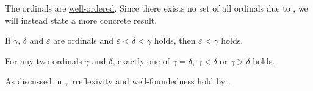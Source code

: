 \begin{proposition}\label{thm:ordinals_are_well_ordered}
  The ordinals are \hyperref[def:well_ordered_set]{well-ordered}. Since there exists no set of all ordinals due to , we will instead state a more concrete result.

  \begin{thmenum}
     If \( \gamma \), \( \delta \) and \( \varepsilon \) are ordinals and \( \varepsilon < \delta < \gamma \) holds, then \( \varepsilon < \gamma \) holds.

     For any two ordinals \( \gamma \) and \( \delta \), exactly one of \( \gamma = \delta \), \( \gamma < \delta \) or \( \gamma > \delta \) holds.
  \end{thmenum}

  As discussed in , irreflexivity and well-foundedness hold by .
\end{proposition}
